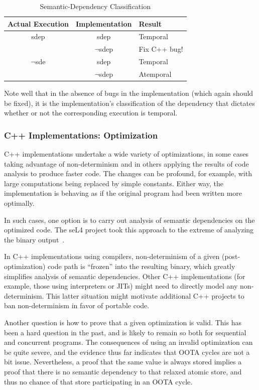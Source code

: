 \documentclass[10]{article}
\begin{document}
\begin{table}
\centering
\begin{tabular}{c|c|l}
Actual Execution	& Implementation	& Result \\
\hline
sdep			& sdep			& Temporal \\
\cline{2-3}
			& $\neg$sdep		& Fix C++ bug! \\
\hline
$\neg$sde		& sdep			& Temporal \\
\cline{2-3}
			& $\neg$sdep		& Atemporal \\
\end{tabular}
\caption{Semantic-Dependency Classification}
\label{tab:Semantic-Dependency Classification}
\end{table}

Note well that in the absence of bugs in the implementation (which
again should be fixed), it is the implementation's classification of
the dependency that dictates whether or not the corresponding execution
is temporal.

\subsubsection{C++ Implementations: Optimization}
\label{sec:C++ Implementations: Optimization}

C++ implementations undertake a wide variety of optimizations, in
some cases taking advantage of non-determinism and in others applying
the results of code analysis to produce faster code.
The changes can be profound, for example, with large computations being
replaced by simple constants.
Either way, the implementation is behaving as if the original program
had been written more optimally.

In such cases, one option is to carry out analysis of semantic dependencies
on the optimized code.
The seL4 project took this approach to the extreme of analyzing
the binary output~\cite{ThomasSewell2013L4binaryVerification}.

In C++ implementations using compilers, non-determinism of a given
(post-optimization) code path is ``frozen'' into the resulting binary,
which greatly simplifies analysis of semantic dependencies.
Other C++ implementations (for example, those using interpreters or JITs)
might need to directly model any non-determinism.
This latter situation might motivate additional C++ projects to ban
non-determinism in favor of portable code.

Another question is how to prove that a given optimization is valid.
This has been a hard question in the past, and is likely to remain so
both for sequential and concurrent programs.
The consequences of using an invalid optimization can be quite severe,
and the evidence thus far indicates that OOTA cycles are not a bit issue.
Nevertheless, a proof that the same value is always stored implies a
proof that there is no semantic dependency to that relaxed atomic store,
and thus no chance of that store participating in an OOTA cycle.
\end{document}
